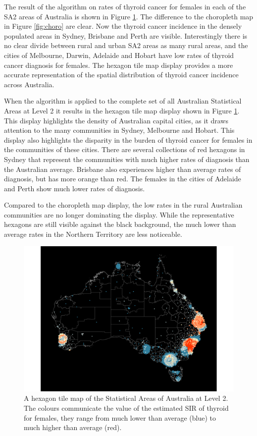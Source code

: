 The result of the algorithm on rates of thyroid cancer for females in
each of the SA2 areas of Australia is shown in Figure \ref{fig:hexmap}.
The difference to the choropleth map in Figure \ref{fig:choro} are
clear. Now the thyroid cancer incidence in the densely populated areas
in Sydney, Brisbane and Perth are visible. Interestingly there is no
clear divide between rural and urban SA2 areas as many rural areas, and
the cities of Melbourne, Darwin, Adelaide and Hobart have low rates of
thyroid cancer diagnosis for females. The hexagon tile map display
provides a more accurate representation of the spatial distribution of
thyroid cancer incidence across Australia.

When the algorithm is applied to the complete set of all Australian
Statistical Areas at Level 2 it results in the hexagon tile map display
shown in Figure \ref{fig:hexmap}. This display highlights the density of
Australian capital cities, as it draws attention to the many communities
in Sydney, Melbourne and Hobart. This display also highlights the
disparity in the burden of thyroid cancer for females in the communities
of these cities. There are several collections of red hexagons in Sydney
that represent the communities with much higher rates of diagnosis than
the Australian average. Brisbane also experiences higher than average
rates of diagnosis, but has more orange than red. The females in the
cities of Adelaide and Perth show much lower rates of diagnosis.

Compared to the choropleth map display, the low rates in the rural
Australian communities are no longer dominating the display. While the
representative hexagons are still visible against the black background,
the much lower than average rates in the Northern Territory are less
noticeable.

\begin{Schunk}
\begin{figure}
\includegraphics[width=0.95\linewidth]{kobakian-cook_files/figure-latex/hexmap-1} \caption[A hexagon tile map of the Statistical Areas of Australia at Level 2]{A hexagon tile map of the Statistical Areas of Australia at Level 2. The colours communicate the value of the estimated SIR of thyroid for females, they range from much lower than average (blue) to much higher than average (red).}\label{fig:hexmap}
\end{figure}
\end{Schunk}

